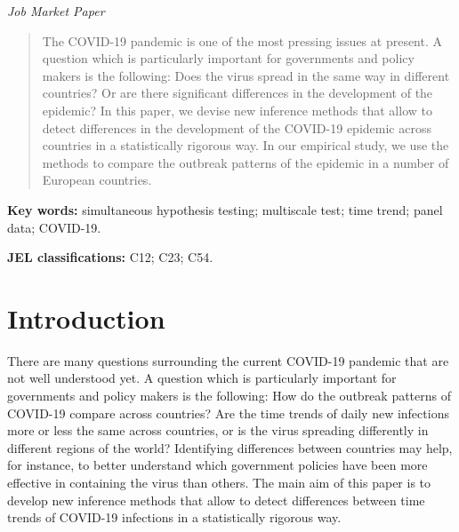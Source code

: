 \documentclass[a4paper,12pt]{article}
\numberwithin{equation}{section}
\begin{document}
\renewcommand{\thefootnote}{2}
\renewcommand{\thefootnote}{\arabic{footnote}}
\setcounter{footnote}{2}
\vspace{-0.7cm}
\begin{center}
{\large \textit{Job Market Paper}}
\end{center}
\vspace{-1.3cm}
\renewcommand{\abstractname}{}
\begin{abstract}
\noindent The COVID-19 pandemic is one of the most pressing issues at present. A question which is particularly important for governments and policy makers is the following: Does the virus spread in the same way in different countries? Or are there significant differences in the development of the epidemic? In this paper, we devise new inference methods that allow to detect differences in the development of the COVID-19 epidemic across countries in a statistically rigorous way. In our empirical study, we use the methods to compare the outbreak patterns of the epidemic in a number of European countries.
\end{abstract}

\renewcommand{\baselinestretch}{1.2}\normalsize

\noindent \textbf{Key words:} simultaneous hypothesis testing; multiscale test; time trend; panel data; COVID-19.

\noindent \textbf{JEL classifications:} C12; C23; C54.




\section{Introduction}


There are many questions surrounding the current COVID-19 pandemic that are not well understood yet. A question which is particularly important for governments and policy makers is the following: How do the outbreak patterns of COVID-19 compare across countries? Are the time trends of daily new infections more or less the same across countries, or is the virus spreading differently in different regions of the world? Identifying differences between countries may help, for instance, to better understand which government policies have been more effective in containing the virus than others. The main aim of this paper is to develop new inference methods that allow to detect differences between time trends of COVID-19 infections in a statistically rigorous way.  
\end{document}
